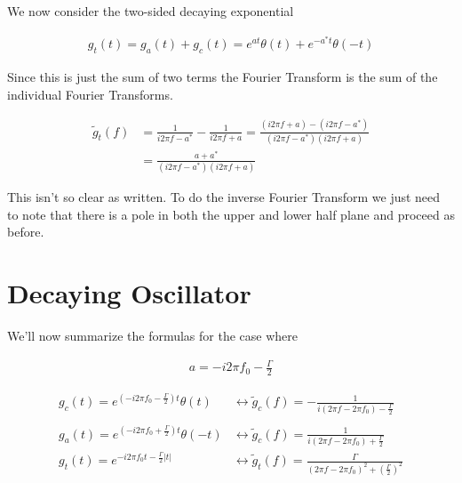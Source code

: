\documentclass[12pt]{article}
\begin{document}
We now consider the two-sided decaying exponential

\begin{align}
g_t(t) = g_a(t) + g_c(t) = e^{at}\theta(t) + e^{-a^*t}\theta(-t)
\end{align}

Since this is just the sum of two terms the Fourier Transform is the sum of the individual Fourier Transforms.

\begin{align}
\tilde{g}_t(f) &= \frac{1}{i 2 \pi f - a^*} - \frac{1}{i 2 \pi f + a} = \frac{(i 2 \pi f + a) - (i 2 \pi f - a^*)}{(i 2 \pi f - a^*)(i 2 \pi f + a)}\\
&= \frac{a + a^*}{(i 2\pi f - a^*)(i 2 \pi f + a)}
\end{align}

This isn't so clear as written. To do the inverse Fourier Transform we just need to note that there is a pole in both the upper and lower half plane and proceed as before.

\section{Decaying Oscillator}

We'll now summarize the formulas for the case where

\begin{align}
a = -i 2\pi f_0 - \frac{\Gamma}{2}
\end{align}

\begin{align}
g_c(t) = e^{\left(-i 2\pi f_0 - \frac{\Gamma}{2}\right) t}\theta(t) &\leftrightarrow \tilde{g}_c(f) = - \frac{1}{i (2\pi f-2 \pi f_0) - \frac{\Gamma}{2}}\\\\
g_a(t) = e^{\left(-i 2\pi f_0 + \frac{\Gamma}{2}\right) t}\theta(-t) &\leftrightarrow \tilde{g}_c(f) = \frac{1}{i (2\pi f-2 \pi f_0) + \frac{\Gamma}{2}}\\
g_t(t) = e^{-i 2 \pi f_0 t - \frac{\Gamma}{2} \lvert t \rvert} &\leftrightarrow \tilde{g}_t(f) =  \frac{\Gamma}{(2\pi f - 2\pi f_0)^2 + \left(\frac{\Gamma}{2}\right)^2}
\end{align}
\end{document}
